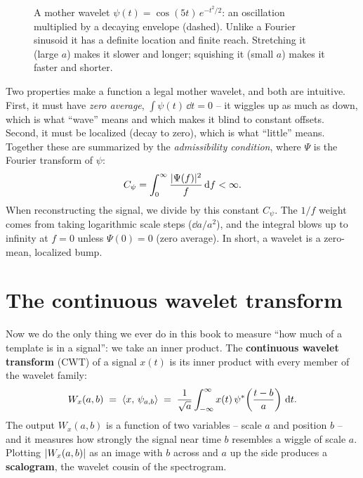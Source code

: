 \begin{figure}[H]
\centering
{}
\caption{A mother wavelet $\psi(t) = \cos(5t)\,e^{-t^2/2}$: an oscillation
multiplied by a decaying envelope (dashed). Unlike a Fourier sinusoid it has a
definite location and finite reach. Stretching it (large $a$) makes it slower and
longer; squishing it (small $a$) makes it faster and shorter.}
\label{ch24:morlet}
\end{figure}

Two properties make a function a legal mother wavelet, and both are intuitive.
First, it must have \emph{zero average}, $\int \psi(t)\,\dd t = 0$ -- it wiggles
up as much as down, which is what ``wave'' means and which makes it blind to
constant offsets. Second, it must be localized (decay to zero), which is what
``little'' means. Together these are summarized by the \emph{admissibility condition}, where $\Psi$ is the Fourier transform of $\psi$:
\[
  C_\psi = \int_0^\infty \frac{\lvert\Psi(f)\rvert^2}{f} \, \mathrm{d} f < \infty.
\]
When reconstructing the signal, we divide by this constant $C_\psi$. The $1/f$ weight comes from taking logarithmic scale steps ($\dd a/a^2$), and the integral blows up to infinity at $f=0$ unless $\Psi(0)=0$ (zero average). In short, a wavelet is a zero-mean, localized bump.

\section{The continuous wavelet transform}
\label{ch24:cwt}

Now we do the only thing we ever do in this book to measure ``how much of a
template is in a signal'': we take an inner product. The
\textbf{continuous wavelet transform} (CWT) of a signal $x(t)$ is its inner
product with every member of the wavelet family:
\begin{equation}
\label{ch24:cwt-defn}
W_x(a,b) \;=\; \langle x,\, \psi_{a,b} \rangle
\;=\; \frac{1}{\sqrt{a}}\int_{-\infty}^{\infty}
x(t)\,\psi^{*}\!\left(\frac{t-b}{a}\right)\,\mathrm{d} t.
\end{equation}
The output $W_x(a,b)$ is a function of two variables -- scale $a$ and position $b$
-- and it measures how strongly the signal near time $b$ resembles a wiggle of scale $a$.
Plotting $\lvert W_x(a,b)\rvert$ as an image with $b$ across and $a$ up the side produces a \textbf{scalogram}, the
wavelet cousin of the spectrogram.

